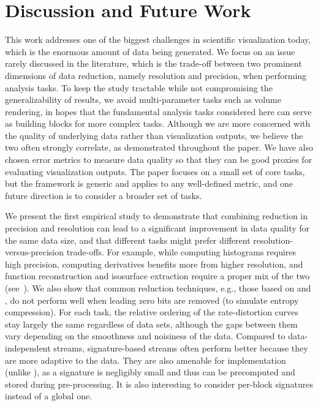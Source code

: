 \section{Discussion and Future Work}

{\color{blue}This work addresses one of the biggest challenges in scientific visualization today,
which is the enormous amount of data being generated. We focus on an issue rarely discussed in the
literature, which is the trade-off between two prominent dimensions of data reduction, namely
resolution and precision, when performing analysis tasks. To keep the study tractable while not
compromising the generalizability of results, we avoid multi-parameter tasks such as volume
rendering, in hopes that the fundamental analysis tasks considered here can serve as building blocks
for more complex tasks. Although we are more concerned with the quality of underlying data rather
than visualization outputs, we believe the two often strongly correlate, as demonstrated throughout
the paper. We have also chosen error metrics to measure data quality so that they can be good
proxies for evaluating visualization outputs. The paper focuses on a small set of core tasks, but
the framework is generic and applies to any well-defined metric, and one future direction is to
consider a broader set of tasks.}

We present the first empirical study to demonstrate that combining reduction in precision and
resolution can lead to a significant improvement in data quality for the same data size, and that
different tasks might prefer different resolution-versus-precision trade-offs. For example, while
computing histograms requires high precision, computing derivatives benefits more from higher
resolution, and function reconstruction and isosurface extraction require a proper mix of the two
(see~). We also show that common reduction techniques, e.g., those based on
\slvl and \smag, do not perform well when leading zero bits are removed (to simulate entropy
compression). {\color{red}For each task, the relative ordering of the rate-distortion curves stay
largely the same regardless of data sets, although the gaps between them vary depending on the
smoothness and noisiness of the data. Compared to data-independent streams, signature-based streams
often perform better because they are more adaptive to the data. They are also amenable for
implementation (unlike \sopt), as a signature is negligibly small and thus can be precomputed and
stored during pre-processing. It is also interesting to consider per-block signatures instead of a
global one.}

